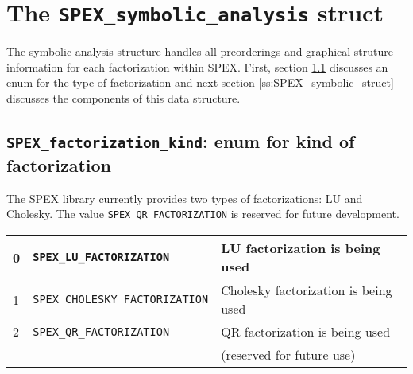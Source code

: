 \documentclass[12pt,oneside]{book}
\theoremstyle{definition}
\newenvironment{SizedCenteredTabular}[2][\small]
    {   
        #1\begin{center}\begin{tabular}{#2}
    }{ 
        \end{tabular}\end{center}
    }
\begin{document}
\section{The \texttt{SPEX\_symbolic\_analysis} struct} \label{s:spex_symbolic_analysis}
The symbolic analysis structure handles all preorderings and graphical struture information for each factorization within SPEX. First, section \ref{ss:spex_factorization_kind} discusses an enum for the type of factorization and next section \ref{ss:SPEX_symbolic_struct} discusses the components of this data structure.


\subsection{\texttt{SPEX\_factorization\_kind}: enum for kind of factorization} \label{ss:spex_factorization_kind}

The SPEX library currently provides two types of factorizations: LU and Cholesky. The value
\verb|SPEX_QR_FACTORIZATION| is reserved for future development.

\begin{SizedCenteredTabular}{lll} \hline
0 & \verb|SPEX_LU_FACTORIZATION|       & LU factorization is being used \\ \hline
1 & \verb|SPEX_CHOLESKY_FACTORIZATION| & Cholesky factorization is being used\\ \hline
2 & \verb|SPEX_QR_FACTORIZATION|       & QR factorization is being used \\ 
  &                                    & (reserved for future use)\\ \hline
\end{SizedCenteredTabular}
\end{document}
